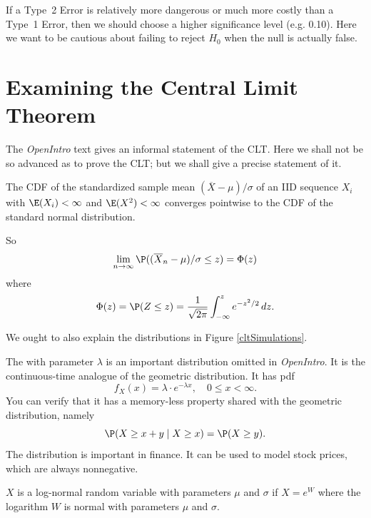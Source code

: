 If a Type~2 Error is relatively more dangerous or much more costly than a Type~1 Error, then we should choose a higher significance level (e.g. 0.10). Here we want to be cautious about failing to reject $H_0$ when the null is actually false.






\section{Examining the Central Limit Theorem}
\label{cltSection}



The \emph{OpenIntro} text gives an informal statement of the CLT. Here we shall not be so advanced as to prove the CLT; but we shall give a precise statement of it.

The CDF of the standardized sample mean $(\overline X-\mu)/\sigma$ of an IID sequence $X_i$ with $\E(X_i)<\infty$ and $\E(X^2)<\infty$ converges pointwise to the CDF of the standard normal distribution.

So
\[
	\lim_{n\to\infty} \P((\overline X_n-\mu)/\sigma\le z) = \Phi(z)
\]
where
\[
	\Phi(z)=\P(Z\le z)=\frac1{\sqrt{2\pi}}\int_{-\infty}^z e^{-z^2/2}\,dz.
\]


We ought to also explain the distributions in Figure \ref{cltSimulations}.

The  with parameter $\lambda$ is an important distribution omitted in \emph{OpenIntro}. It is the continuous-time analogue of the geometric distribution. It has pdf
\[
	f_X(x)=\lambda\cdot e^{-\lambda x},\quad 0\le x<\infty.
\]
You can verify that it has a memory-less property shared with the geometric distribution, namely
\[
	\P(X\ge x+y\mid X\ge x) = \P(X\ge y).
\]
The  distribution is important in finance. It can be used to model stock prices, which are always nonnegative.
\begin{df}\label{lognormal}
$X$ is a log-normal random variable with parameters $\mu$ and $\sigma$ if $X=e^W$ where the logarithm $W$ is normal with parameters $\mu$ and $\sigma$.
\end{df}

